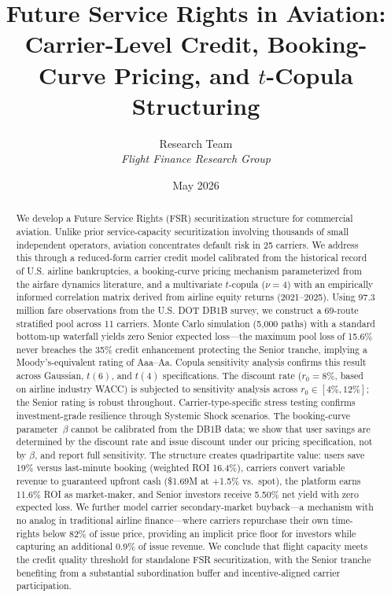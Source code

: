 \documentclass[12pt,a4paper]{article}
\begin{document}
\title{\textbf{Future Service Rights in Aviation:}\\%
\large Carrier-Level Credit, Booking-Curve Pricing, and $t$-Copula Structuring}

\author{Research Team\\
\textit{Flight Finance Research Group}}

\date{May 2026}
\maketitle

\begin{abstract}
We develop a Future Service Rights (FSR) securitization structure for commercial aviation. Unlike prior service-capacity securitization involving thousands of small independent operators, aviation concentrates default risk in 25 carriers. We address this through a reduced-form carrier credit model calibrated from the historical record of U.S. airline bankruptcies, a booking-curve pricing mechanism parameterized from the airfare dynamics literature, and a multivariate $t$-copula ($\nu=4$) with an empirically informed correlation matrix derived from airline equity returns (2021--2025). Using 97.3 million fare observations from the U.S. DOT DB1B survey, we construct a 69-route stratified pool across 11 carriers. Monte Carlo simulation (5,000 paths) with a standard bottom-up waterfall yields zero Senior expected loss---the maximum pool loss of 15.6\% never breaches the 35\% credit enhancement protecting the Senior tranche, implying a Moody's-equivalent rating of Aaa--Aa. Copula sensitivity analysis confirms this result across Gaussian, $t(6)$, and $t(4)$ specifications. The discount rate ($r_0 = 8\%$, based on airline industry WACC) is subjected to sensitivity analysis across $r_0 \in [4\%, 12\%]$; the Senior rating is robust throughout. Carrier-type-specific stress testing confirms investment-grade resilience through Systemic Shock scenarios. The booking-curve parameter~$\beta$ cannot be calibrated from the DB1B data; we show that user savings are determined by the discount rate and issue discount under our pricing specification, not by $\beta$, and report full sensitivity. The structure creates quadripartite value: users save 19\% versus last-minute booking (weighted ROI 16.4\%), carriers convert variable revenue to guaranteed upfront cash (\$1.69M at +1.5\% vs.\ spot), the platform earns 11.6\% ROI as market-maker, and Senior investors receive 5.50\% net yield with zero expected loss. We further model carrier secondary-market buyback---a mechanism with no analog in traditional airline finance---where carriers repurchase their own time-rights below 82\% of issue price, providing an implicit price floor for investors while capturing an additional 0.9\% of issue revenue. We conclude that flight capacity meets the credit quality threshold for standalone FSR securitization, with the Senior tranche benefiting from a substantial subordination buffer and incentive-aligned carrier participation.
\end{abstract}
\end{document}
